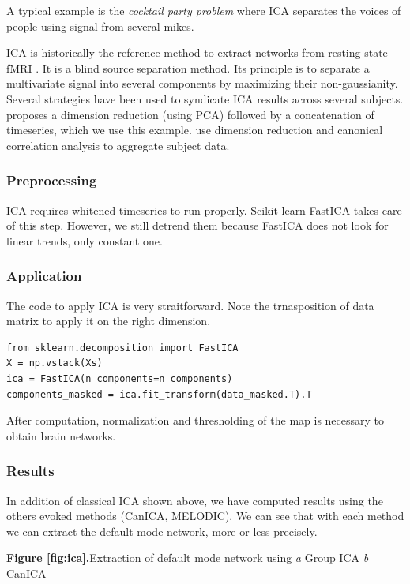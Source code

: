 \documentclass{frontiersSCNS} %
\begin{document}
A typical example is the \emph{cocktail party problem} where ICA separates the
voices of people using signal from several mikes.

ICA is historically the reference method to extract networks from resting state
fMRI \cite{biswal1999}. It is a blind source separation method. Its principle is
to separate a
multivariate signal into several components by maximizing their non-gaussianity.
Several strategies have been used to syndicate ICA
results across several subjects. \cite{calhoun2001a} proposes a dimension
reduction (using PCA) followed by a concatenation of timeseries, which we use
this example.
\cite{varoquaux2010} use dimension reduction and canonical correlation analysis
to aggregate subject data.

\subsubsection{Preprocessing}

ICA requires whitened timeseries to run properly. Scikit-learn FastICA takes care
of this step. However, we still detrend them because
FastICA does not look for linear trends, only constant one.

\subsubsection{Application}

The code to apply ICA is very straitforward. Note the trnasposition of data
matrix to apply it on the right dimension.

\begin{lstlisting}
from sklearn.decomposition import FastICA
X = np.vstack(Xs)
ica = FastICA(n_components=n_components)
components_masked = ica.fit_transform(data_masked.T).T
\end{lstlisting}

After computation, normalization and thresholding of the map is necessary to
obtain brain networks.

\subsubsection{Results}

In addition of classical ICA shown above, we have computed results using the
others evoked methods (CanICA, MELODIC). We can see that with each method we can
extract the default mode network, more or less precisely.

\textbf{Figure \ref{fig:ica}.}{Extraction of default mode network using \textit{a} Group ICA
  \textit{b} CanICA}\label{fig:03}
\end{document}
